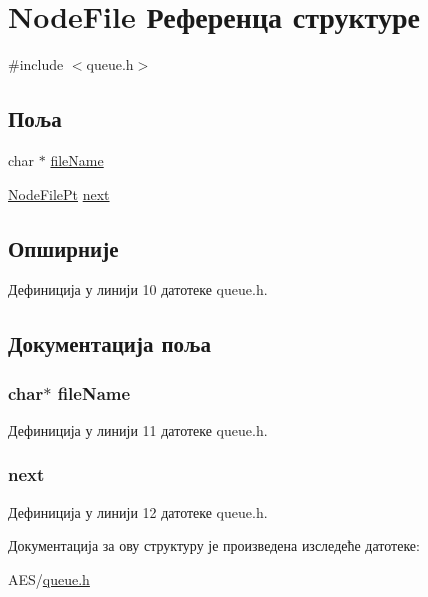 \hypertarget{struct_node_file}{\section{Node\+File Референца структуре}
\label{struct_node_file}
}


{\ttfamily \#include $<$queue.\+h$>$}

\subsection*{Поља}
\begin{DoxyCompactItemize}
\item 
char $\ast$ \hyperlink{struct_node_file_a25c8761bc1f523fe6a53db546ae83add}{file\+Name}
\item 
\hyperlink{queue_8h_a21054bd6fff2213f6e09f4e5b11300b9}{Node\+File\+Pt} \hyperlink{struct_node_file_a6e3ae14a411e5a0f5573bd9deb9b4a43}{next}
\end{DoxyCompactItemize}


\subsection{Опширније}


Дефиниција у линији 10 датотеке queue.\+h.



\subsection{Документација поља}
\hypertarget{struct_node_file_a25c8761bc1f523fe6a53db546ae83add}{
\subsubsection[{file\+Name}]{\setlength{\rightskip}{0pt plus 5cm}char$\ast$ file\+Name}}\label{struct_node_file_a25c8761bc1f523fe6a53db546ae83add}


Дефиниција у линији 11 датотеке queue.\+h.

\hypertarget{struct_node_file_a6e3ae14a411e5a0f5573bd9deb9b4a43}{
\subsubsection[{next}]{ next}}\label{struct_node_file_a6e3ae14a411e5a0f5573bd9deb9b4a43}


Дефиниција у линији 12 датотеке queue.\+h.



Документација за ову структуру је произведена изследеће датотеке\+:\begin{DoxyCompactItemize}
\item 
A\+E\+S/\hyperlink{queue_8h}{queue.\+h}\end{DoxyCompactItemize}
